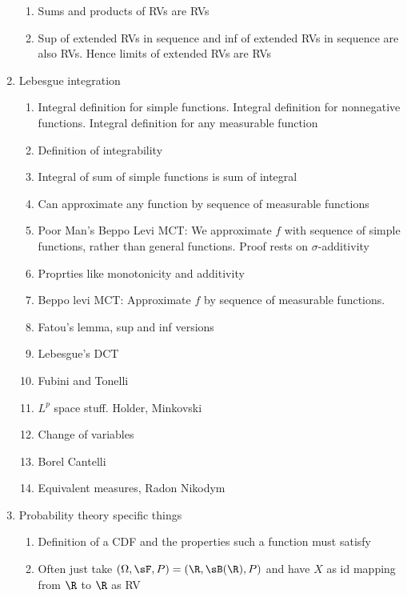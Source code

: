\documentclass[12pt]{article}
\theoremstyle{plain}
\theoremstyle{definition}
\theoremstyle{remark}
\begin{document}
\begin{enumerate}
\begin{enumerate}
    \item Sums and products of RVs are RVs

    \item Sup of extended RVs in sequence and inf of extended RVs in
      sequence are also RVs. Hence limits of extended RVs are RVs
  \end{enumerate}



  \item Lebesgue integration
    \begin{enumerate}
      \item Integral definition for simple functions.
        Integral definition for nonnegative functions.
        Integral definition for any measurable function
      \item Definition of integrability
      \item Integral of sum of simple functions is sum of integral
      \item Can approximate any function by sequence of measurable
        functions
      \item Poor Man's Beppo Levi MCT: We approximate $f$ with sequence
        of simple functions, rather than general functions.
        Proof rests on $\sigma$-additivity
      \item Proprties like monotonicity and additivity
      \item Beppo levi MCT: Approximate $f$ by sequence of measurable
        functions.
      \item Fatou's lemma, sup and inf versions
      \item Lebesgue's DCT
      \item Fubini and Tonelli
      \item $L^p$ space stuff. Holder, Minkovski
      \item Change of variables
      \item Borel Cantelli
      \item Equivalent measures, Radon Nikodym
    \end{enumerate}

  \item Probability theory specific things
    \begin{enumerate}
      \item Definition of a CDF and the properties such a function must
        satisfy

      \item
        Often just take $(\Omega,\sF,P)=(\R,\sB(\R),P)$ and have $X$ as id
        mapping from $\R$ to $\R$ as RV


\end{enumerate}
\end{enumerate}
\end{document}
